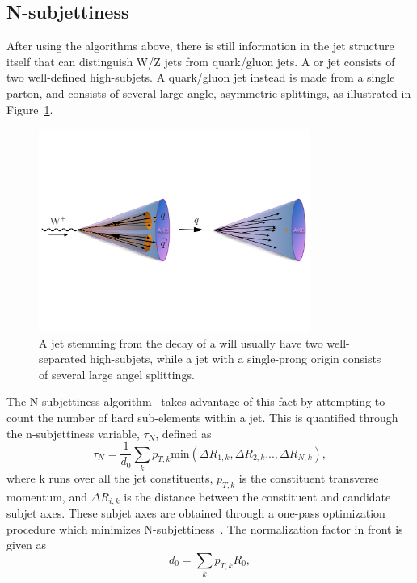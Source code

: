 \subsection{N-subjettiness}
After using the algorithms above, there is still information in the jet structure itself that can distinguish W/Z jets from quark/gluon jets. A \PW or \PZ jet consists of two well-defined high-\PT subjets. A quark/gluon jet instead is made from a single parton, and consists of several large angle, asymmetric splittings, as illustrated in Figure~\ref{fig:objreco:onevstwoprong}.
\begin{figure}[h!] 
    \centering 
    \includegraphics[width=0.790\textwidth]{figures/event_reconstruction/tau21_sketch.pdf}
     \caption{A jet stemming from the decay of a \PW will usually have two well-separated high-\pt subjets, while a jet with a single-prong origin consists of several large angel splittings.}
     \label{fig:objreco:onevstwoprong}
 \end{figure}
The N-subjettiness algorithm~\cite{Thaler:2010tr} takes advantage of this fact by attempting to count the number of hard sub-elements within a jet. This is quantified through the n-subjettiness variable, $\tau_N$, defined as
 \begin{equation}
 \tau_N = \frac{1}{d_0} \sum_k p_{T,k}\textrm{min}( \Delta R_{1,k},\Delta R_{2,k}...,\Delta R_{N,k}),
 \end{equation} 
where k runs over all the jet constituents, $p_{T,k}$ is the constituent transverse momentum, and $\Delta R_{i,k}$ is the distance between the constituent and candidate subjet axes. These subjet axes are obtained through a one-pass optimization procedure which minimizes N-subjettiness~\cite{Thaler2012}. The normalization factor in front is given as
 \begin{equation}
d_0 = \sum_k p_{T,k} R_0,
 \end{equation} 
